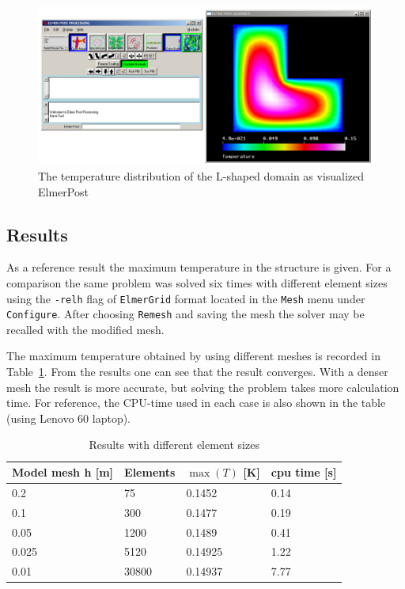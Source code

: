 \begin{figure}
\begin{center}
\includegraphics[width=140mm]{Tangle_post}
\caption{The temperature distribution of the L-shaped domain as visualized ElmerPost}\label{fg:post1}
\end{center}
\end{figure}


\subsection*{Results}

As a reference result the maximum temperature in the structure is given. For a
comparison the same problem was solved six times with different
element sizes using the \texttt{-relh} flag of \texttt{ElmerGrid} format located in the
\texttt{Mesh} menu under \texttt{Configure}. After choosing \texttt{Remesh} and saving the mesh 
the solver may be recalled with the modified mesh.

The maximum temperature obtained by using different
meshes is recorded in Table~\ref{tb:res1}.  From the results one
can see that the result converges. With a denser mesh the result is
more accurate, but solving the problem takes more calculation time.
For reference, the CPU-time used in each case is
also shown in the table (using Lenovo 60 laptop).

\begin{table}[h]
\caption{Results with different element sizes}
\label{tb:res1}
\begin{center}
\begin{tabular}{llll} \hline
Model mesh h [m] & Elements & $\max (T)$ [K] & cpu time [s]\\ \hline
0.2 & 75 &  0.1452  & 0.14 \\
0.1 &  300 & 0.1477  & 0.19 \\
0.05 & 1200 & 0.1489  & 0.41 \\ 
0.025 & 5120 & 0.14925 & 1.22 \\ 
0.01  & 30800 & 0.14937 & 7.77 \\ \hline
\end{tabular}
\end{center}
\end{table}

\hfill



